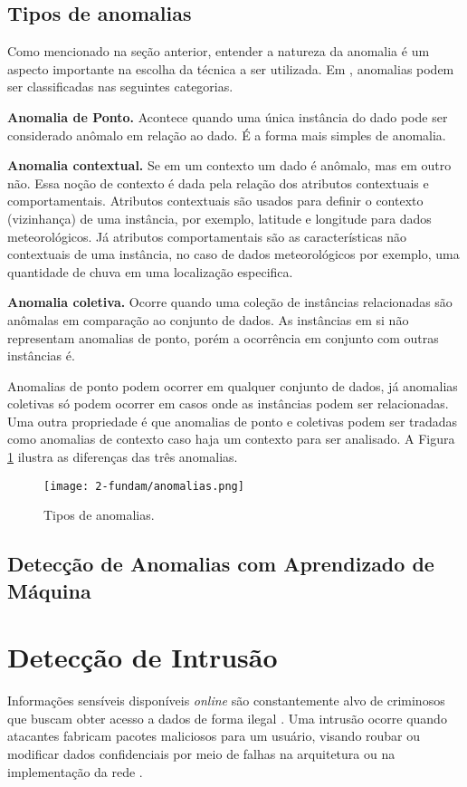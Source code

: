 \subsection{Tipos de anomalias}
\label{anml:def}
Como mencionado na seção anterior, entender a natureza da anomalia é um aspecto importante na escolha da técnica a ser utilizada. Em \cite{Chandola2009}, anomalias podem ser classificadas nas seguintes categorias.

\textbf{Anomalia de Ponto.} Acontece quando uma única instância do dado pode ser considerado anômalo em relação ao dado. É a forma mais simples de anomalia.

\textbf{Anomalia contextual.} Se em um contexto um dado é anômalo, mas em outro não. Essa noção de contexto é dada pela relação dos atributos contextuais e comportamentais. Atributos contextuais são usados para definir o contexto (vizinhança) de uma instância, por exemplo, latitude e longitude para dados meteorológicos. Já atributos comportamentais são as características não contextuais de uma instância, no caso de dados meteorológicos por exemplo, uma quantidade de chuva em uma localização especifica.

\textbf{Anomalia coletiva.} Ocorre quando uma coleção de instâncias relacionadas são anômalas em comparação ao conjunto de dados. As instâncias em si não representam anomalias de ponto, porém a ocorrência em conjunto com outras instâncias é.

Anomalias de ponto podem ocorrer em qualquer conjunto de dados, já anomalias coletivas só podem ocorrer em casos onde as instâncias podem ser relacionadas. Uma outra propriedade é que anomalias de ponto e coletivas podem ser tradadas como anomalias de contexto caso haja um contexto para ser analisado. A Figura \ref{fig:tipos-anomalias} ilustra as diferenças das três anomalias.

\begin{figure}[h]
    \centering
    \texttt{[image: 2-fundam/anomalias.png]}
    \caption{Tipos de anomalias.}
    \label{fig:tipos-anomalias}
\end{figure}

\subsection{Detecção de Anomalias com Aprendizado de Máquina}
\label{anml:ml}

\section{Detecção de Intrusão}
\label{ids}
Informações sensíveis disponíveis \textit{online} são constantemente alvo de criminosos que buscam obter acesso a dados de forma ilegal \citep[p.~35]{anderson2020security}. Uma intrusão ocorre quando atacantes fabricam pacotes maliciosos para um usuário, visando roubar ou modificar dados confidenciais por meio de falhas na arquitetura ou na implementação da rede \citep{Kunal2019}.

